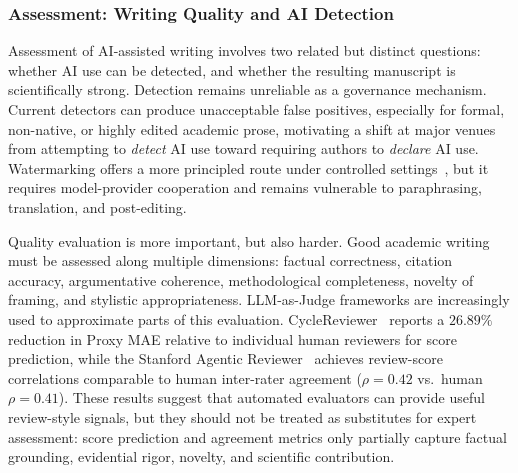 


\subsubsection{Assessment: Writing Quality and AI Detection}
\label{sec:writing_detection_eval}

Assessment of AI-assisted writing involves two related but distinct questions: whether AI use can be detected, and whether the resulting manuscript is scientifically strong. Detection remains unreliable as a governance mechanism. Current detectors can produce unacceptable false positives, especially for formal, non-native, or highly edited academic prose, motivating a shift at major venues from attempting to \emph{detect} AI use toward requiring authors to \emph{declare} AI use. Watermarking offers a more principled route under controlled settings~\cite{watermarking2025}, but it requires model-provider cooperation and remains vulnerable to paraphrasing, translation, and post-editing.

Quality evaluation is more important, but also harder. Good academic writing must be assessed along multiple dimensions: factual correctness, citation accuracy, argumentative coherence, methodological completeness, novelty of framing, and stylistic appropriateness. LLM-as-Judge frameworks are increasingly used to approximate parts of this evaluation. CycleReviewer~\cite{cycleresearcher2024} reports a $26.89\%$ reduction in Proxy MAE relative to individual human reviewers for score prediction, while the Stanford Agentic Reviewer~\cite{stanfordreviewer2025} achieves review-score correlations comparable to human inter-rater agreement ($\rho=0.42$ vs.\ human $\rho=0.41$). These results suggest that automated evaluators can provide useful review-style signals, but they should not be treated as substitutes for expert assessment: score prediction and agreement metrics only partially capture factual grounding, evidential rigor, novelty, and scientific contribution.

